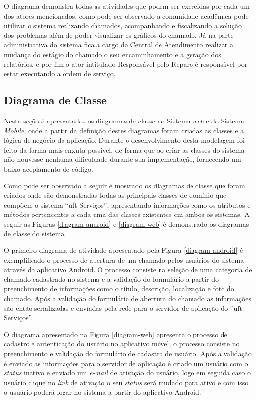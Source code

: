 O diagrama demonstra todas as atividades que podem ser exercidas por cada um dos atores mencionados, como pode ser observado a comunidade acadêmica pode utilizar o sistema realizando chamados, acompanhando e fiscalizando a solução dos problemas além de poder visualizar os gráficos do chamado. Já na parte administrativa do sistema fica a cargo da Central de Atendimento realizar a mudança do estágio do chamado o seu encaminhamento e a geração dos relatórios, e por fim o ator intitulado Responsável pelo Reparo é responsável por estar executando a ordem de serviço.

\subsection*{Diagrama de Classe}

\noindent Nesta seção é apresentados os diagramas de classe do Sistema \textit{web} e do Sistema \textit{Mobile}, onde a partir da definição destes diagramas foram criadas as classes e a lógica de negócio da aplicação. Durante o desenvolvimento desta modelagem foi feito da forma mais enxuta possível, de forma que ao criar as classes do sistema não houvesse nenhuma dificuldade durante sua implementação, fornecendo um baixo acoplamento de código.

Como pode ser observado a seguir é mostrado os diagramas de classe que foram criados onde são demonstradas todas as principais classes de domínio que compõem o sistema ``\acrshort{uft} Serviços'', apresentando informações como os atributos e métodos pertencentes a cada uma das classes existentes em ambos os sistemas. A seguir as Figuras \ref{diagram-android} e \ref{diagram-web} é demonstrado os diagramas de classe do sistema.

O primeiro diagrama de atividade apresentado pela Figura \ref{diagram-android} é exemplificado o processo de abertura de um chamado pelos usuários do sistema através do aplicativo Android. O processo consiste na seleção de uma categoria de chamado cadastrado no sistema e a validação do formulário a partir do preenchimento de informações como o título, descrição, localização e foto do chamado. Após a validação do formulário de abertura do chamado as informações são então serializadas e enviadas pela rede para o servidor de aplicação do ``\acrshort{uft} Serviços''.

O diagrama apresentado na Figura \ref{diagram-web} apresenta o processo de cadastro e autenticação do usuário no aplicativo móvel, o processo consiste no preenchimento e validação do formulário de cadastro de usuário. Após a validação é enviado as informações para o servidor de aplicação é criado um usuário com o \textit{status} inativo e enviado um \textit{e-mail} de ativação do usuário, logo em seguida caso o usuário clique no \textit{link} de ativação o seu \textit{status} será mudado para ativo e com isso o usuário poderá logar no sistema a partir do aplicativo Android.

